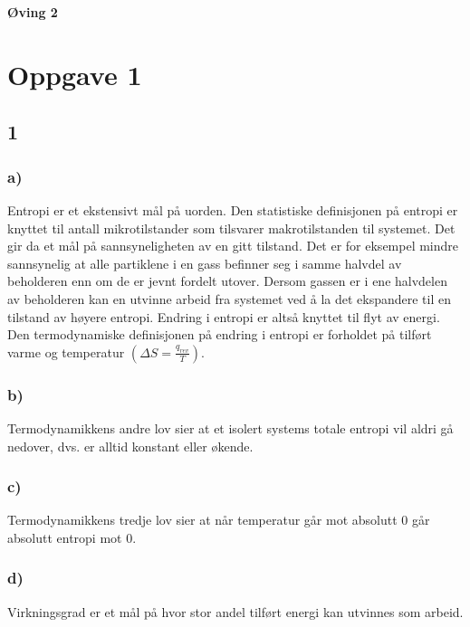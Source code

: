\begin{center}
	\LARGE{\textbf{Øving 2}}
\end{center}


\section*{Oppgave 1}

\subsection*{1}

\subsubsection*{a)}

Entropi er et ekstensivt mål på uorden. Den statistiske definisjonen på entropi er knyttet til antall mikrotilstander som tilsvarer makrotilstanden til systemet. Det gir da et mål på sannsyneligheten av en gitt tilstand. Det er for eksempel mindre sannsynelig at alle partiklene i en gass befinner seg i samme halvdel av beholderen enn om de er jevnt fordelt utover. Dersom gassen er i ene halvdelen av beholderen kan en utvinne arbeid fra systemet ved å la det ekspandere til en tilstand av høyere entropi. Endring i entropi er altså knyttet til flyt av energi. Den termodynamiske definisjonen på endring i entropi er forholdet på tilført varme og temperatur \((\Delta S = \frac{q_{rev}}{T})\).


\subsubsection*{b)}

Termodynamikkens andre lov sier at et isolert systems totale entropi vil aldri gå nedover, dvs. er alltid konstant eller økende.


\subsubsection*{c)}

Termodynamikkens tredje lov sier at når temperatur går mot absolutt 0 går absolutt entropi mot 0.


\subsubsection*{d)}

Virkningsgrad er et mål på hvor stor andel tilført energi kan utvinnes som arbeid.


